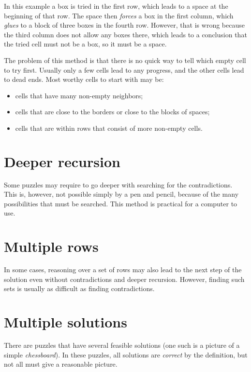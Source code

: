 In this example a box is tried in the first row, which leads to a space at the beginning of that row. The space then \textit{forces} a box in the first column, which \textit{glues} to a block of three boxes in the fourth row. However, that is wrong because the third column does not allow any boxes there, which leads to a conclusion that the tried cell must not be a box, so it must be a space.

The problem of this method is that there is no quick way to tell which empty cell to try first. Usually only a few cells lead to any progress, and the other cells lead to dead ends. Most worthy cells to start with may be:

\begin{itemize} 
 \item {cells that have many non-empty neighbors;}

\item {cells that are close to the borders or close to the blocks of spaces;}

\item {cells that are within rows that consist of more non-empty cells.} 
\end{itemize}



\section{Deeper recursion}
Some puzzles may require to go deeper with searching for the contradictions. This is, however, not possible simply by a pen and pencil, because of the many possibilities that must be searched. This method is practical for a computer to use.


\section{Multiple rows}
In some cases, reasoning over a set of rows may also lead to the next step of the solution even without contradictions and deeper recursion. However, finding such sets is usually as difficult as finding contradictions.


\section{Multiple solutions}
There are puzzles that have several feasible solutions (one such is a picture of a simple \textit{chessboard}). In these puzzles, all solutions are \textit{correct} by the definition, but not all must give a reasonable picture.


